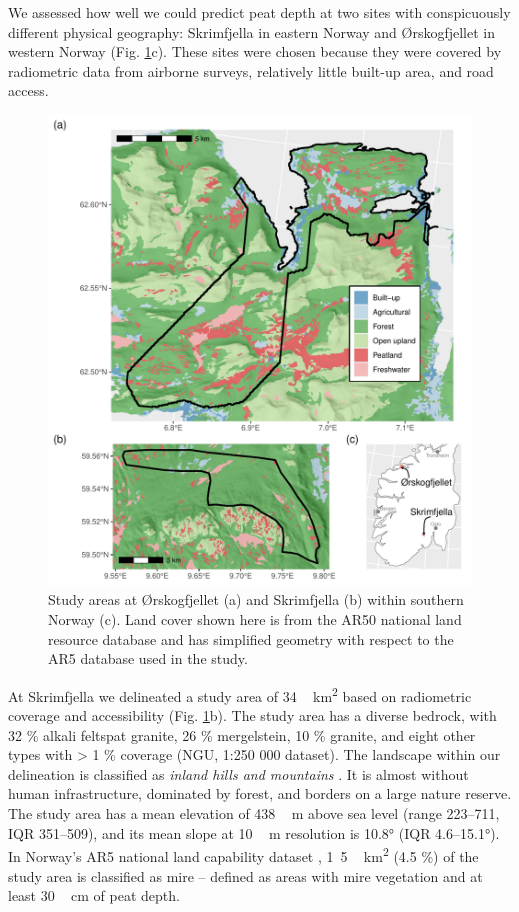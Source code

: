 \documentclass[soil, manuscript]{copernicus}
\begin{document}
We assessed how well we could predict peat depth at two sites with conspicuously different physical geography: Skrimfjella in eastern Norway and Ørskogfjellet in western Norway (Fig. \ref{fig:sites}c).
These sites were chosen because they were covered by radiometric data from airborne surveys, relatively little built-up area, and road access.

\begin{figure}
\includegraphics[height=0.9\textheight]{figures/sites-patchwork} \caption{Study areas at Ørskogfjellet (a) and Skrimfjella (b) within southern Norway (c). Land cover shown here is from the AR50 national land resource database and has simplified geometry with respect to the AR5 database used in the study.}\label{fig:sites}
\end{figure}

At Skrimfjella we delineated a study area of \unit{34\,km^{2}} based on radiometric coverage and accessibility (Fig. \ref{fig:sites}b).
The study area has a diverse bedrock, with 32 \% alkali feltspat granite, 26 \% mergelstein, 10 \% granite, and eight other types with \textgreater{} 1 \% coverage (NGU, 1:250 000 dataset).
The landscape within our delineation is classified as \emph{inland hills and mountains} \citep{simensenDiversityDistributionLandscape2021}.
It is almost without human infrastructure, dominated by forest, and borders on a large nature reserve.
The study area has a mean elevation of \unit{438\,m} above sea level (range 223--711, IQR 351--509), and its mean slope at \unit{10\,m} resolution is 10.8° (IQR 4.6--15.1°).
In Norway's AR5 national land capability dataset \citep{ahlstromAR5Klassifikasjonssystem2019}, \unit{1.5\,km^{2}} (4.5 \%) of the study area is classified as mire -- defined as areas with mire vegetation and at least \unit{30\,cm} of peat depth.
\end{document}
